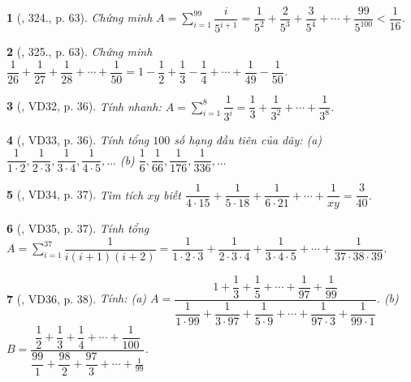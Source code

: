 \documentclass{article}
\newtheorem{baitoan}{}
\begin{document}
\begin{baitoan}[\cite{Tuyen_Toan_6}, 324., p. 63]
	Chứng minh $A = \sum_{i=1}^{99} \dfrac{i}{5^{i+1}} = \dfrac{1}{5^2} + \dfrac{2}{5^3} + \dfrac{3}{5^4} + \cdots + \dfrac{99}{5^{100}} < \dfrac{1}{16}$.
\end{baitoan}

\begin{baitoan}[\cite{Tuyen_Toan_6}, 325., p. 63]
	Chứng minh $\dfrac{1}{26} + \dfrac{1}{27} + \dfrac{1}{28} + \cdots + \dfrac{1}{50} = 1 - \dfrac{1}{2} + \dfrac{1}{3} - \dfrac{1}{4} + \cdots + \dfrac{1}{49} - \dfrac{1}{50}$.
\end{baitoan}

\begin{baitoan}[\cite{Binh_Toan_6_tap_2}, VD32, p. 36]
	Tính nhanh: $A = \sum_{i=1}^8 \dfrac{1}{3^i} = \dfrac{1}{3} + \dfrac{1}{3^2} + \cdots + \dfrac{1}{3^8}$.
\end{baitoan}

\begin{baitoan}[\cite{Binh_Toan_6_tap_2}, VD33, p. 36]
	Tính tổng $100$ số hạng đầu tiên của dãy: (a) $\dfrac{1}{1\cdot2},\dfrac{1}{2\cdot3},\dfrac{1}{3\cdot4},\dfrac{1}{4\cdot5},\ldots$ (b) $\dfrac{1}{6},\dfrac{1}{66},\dfrac{1}{176},\dfrac{1}{336},\ldots$
\end{baitoan}

\begin{baitoan}[\cite{Binh_Toan_6_tap_2}, VD34, p. 37]
	Tìm tích $xy$ biết $\dfrac{1}{4\cdot15} + \dfrac{1}{5\cdot18} + \dfrac{1}{6\cdot21} + \cdots + \dfrac{1}{xy} = \dfrac{3}{40}$.
\end{baitoan}

\begin{baitoan}[\cite{Binh_Toan_6_tap_2}, VD35, p. 37]
	Tính tổng $A = \sum_{i=1}^{37} \dfrac{1}{i(i + 1)(i + 2)} = \dfrac{1}{1\cdot2\cdot3} + \dfrac{1}{2\cdot3\cdot4} + \dfrac{1}{3\cdot4\cdot5} + \cdots + \dfrac{1}{37\cdot38\cdot39}$.
\end{baitoan}

\begin{baitoan}[\cite{Binh_Toan_6_tap_2}, VD36, p. 38]
	Tính: (a) $A = \dfrac{1 + \dfrac{1}{3} + \dfrac{1}{5} + \cdots + \dfrac{1}{97} + \dfrac{1}{99}}{\dfrac{1}{1\cdot99} + \dfrac{1}{3\cdot97} + \dfrac{1}{5\cdot9} + \cdots + \dfrac{1}{97\cdot3} + \dfrac{1}{99\cdot1}}$. (b) $B = \dfrac{\dfrac{1}{2} + \dfrac{1}{3} + \dfrac{1}{4} + \cdots + \dfrac{1}{100}}{\dfrac{99}{1} + \dfrac{98}{2} + \dfrac{97}{3} + \cdots + \frac{1}{99}}$.
\end{baitoan}
\end{document}
